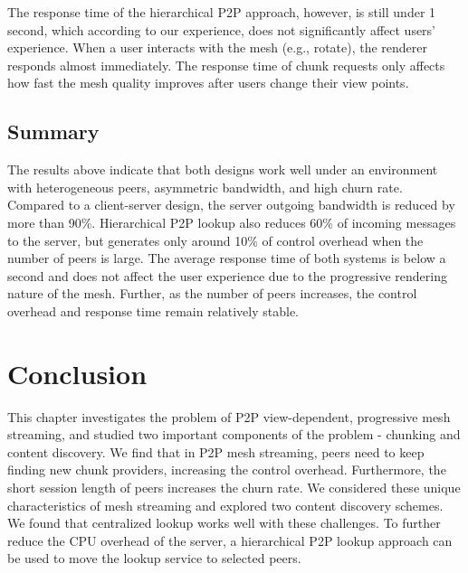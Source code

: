     The response time of the hierarchical P2P approach, however, is still
    under 1 second, which according to our experience, does not
    significantly affect users' experience.  When a user interacts with
    the mesh (e.g., rotate), the renderer responds almost immediately. 
    The response time of chunk requests only affects how fast the 
    mesh quality improves after users change their view points.
    
    
    

    \subsection{Summary}
    The results above indicate that
    both designs work well under an environment with heterogeneous peers, 
    asymmetric bandwidth, and high churn rate. Compared to a
    client-server design, the server outgoing bandwidth 
    is reduced by more than 90\%.  Hierarchical P2P
    lookup also reduces 60\% of incoming messages to the server,
    but generates  
    only around 10\% of control overhead when the number of peers is large. 
    The average response time of both systems is below 
    a second and does not affect the user experience due to the
    progressive rendering nature of the mesh.   
    Further, as the number of peers
    increases, the control overhead and response time remain
    relatively stable.

\section{Conclusion}
\label{s:conclude}
This chapter investigates the problem of P2P view-dependent,
progressive mesh streaming, and studied two important components of
the problem - chunking and content discovery. We find that in P2P mesh
streaming, peers need to keep finding new chunk providers, increasing
the control overhead. Furthermore, the short session length of peers
increases the churn rate. We considered these unique characteristics
of mesh streaming and explored two content discovery schemes. We found
that centralized lookup works well with these challenges. To further
reduce the CPU overhead of the server, a hierarchical P2P lookup
approach can be used to move the lookup service to selected peers.



